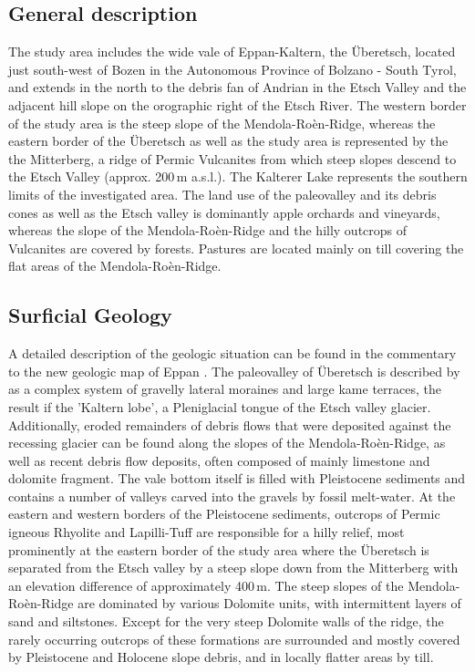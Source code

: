\documentclass[preprint,12pt,authoryear]{elsarticle}
\begin{document}
\subsection{General description}
The study area includes the wide vale of Eppan-Kaltern, the {\"U}beretsch, located just south-west of Bozen in the Autonomous Province of Bolzano - South Tyrol, and extends in the north to the debris fan of Andrian in the Etsch Valley and the adjacent hill slope on the orographic right of the Etsch River. The western border of the study area is the steep slope of the Mendola-Ro\`en-Ridge, whereas the eastern border of the {\"U}beretsch as well as the study area is represented by the the Mitterberg, a ridge of Permic Vulcanites from which steep slopes descend to the Etsch Valley (approx. 200\,m a.s.l.). The Kalterer Lake represents the southern limits of the investigated area. The land use of the paleovalley and its debris cones as well as the Etsch valley is dominantly apple orchards and vineyards, whereas the slope of the  Mendola-Ro\`en-Ridge and the hilly outcrops of Vulcanites are covered by forests. Pastures are located mainly on till covering the flat areas of the  Mendola-Ro\`en-Ridge. 
\subsection{Surficial Geology}
A detailed  description of the geologic situation can be found in the commentary to the new geologic map of Eppan \citep{Avanzini2006}. 
The paleovalley of {\"U}beretsch is described by \cite{Scholz2005} as a complex system of gravelly lateral moraines and large kame terraces, the result if the 'Kaltern lobe', a Pleniglacial tongue of the Etsch valley glacier. Additionally, eroded remainders of debris flows that were deposited against the recessing glacier can be found along the slopes of the Mendola-Ro\`en-Ridge, as well as recent debris flow deposits, often composed of mainly limestone and dolomite fragment. The vale bottom itself is filled with Pleistocene sediments and contains a  number of valleys carved into the gravels by fossil melt-water. At the eastern and western borders of the Pleistocene sediments, outcrops of Permic igneous Rhyolite and Lapilli-Tuff are responsible for a hilly relief, most prominently at the eastern border of the study area where the {\"U}beretsch is separated from the Etsch valley by a steep slope down from the Mitterberg with an elevation difference of approximately 400\,m.   
The steep slopes of the Mendola-Ro\`en-Ridge are dominated by various Dolomite units, with intermittent layers of sand and siltstones. Except for the very steep Dolomite walls of the ridge, the rarely occurring outcrops of these formations are surrounded and mostly covered by Pleistocene and Holocene slope debris, and in locally flatter areas by till. 
 
\end{document}
